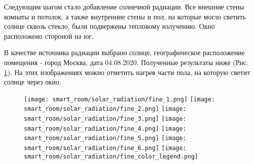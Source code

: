 Следующим шагом стало добавление солнечной радиации.
Все внешние стены комнаты и потолок, а также внутренние стены и пол, на которые могло светить солнце сквозь стекло, были подвержены тепловому излучению. Окно расположено стороной на юг.

В качестве источника радиации выбрано солнце, географическое расположение помещения - город Москва, дата 04.08.2020.
Полученные результаты ниже (Рис. \ref{fine-radiation}). На этих изображениях можно отметить нагрев части пола, на которую светит солнце через окно.

\begin{figure}[H]
\texttt{[image: smart\_room/solar\_radiation/fine\_1.png]}\hfill
\texttt{[image: smart\_room/solar\_radiation/fine\_2.png]}\hfill
\texttt{[image: smart\_room/solar\_radiation/fine\_3.png]}\hfill
\texttt{[image: smart\_room/solar\_radiation/fine\_4.png]}\hfill
\texttt{[image: smart\_room/solar\_radiation/fine\_5.png]}\hfill
\texttt{[image: smart\_room/solar\_radiation/fine\_6.png]}\hfill
\texttt{[image: smart\_room/solar\_radiation/fine\_color\_legend.png]}\hfill
\caption{}
\label{fine-radiation}
\end{figure}











































